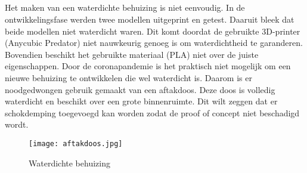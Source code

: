 \subsection{}
Het maken van een waterdichte behuizing is niet eenvoudig. In de ontwikkelingsfase werden twee modellen uitgeprint en getest. Daaruit bleek dat beide modellen niet waterdicht waren. Dit komt doordat de gebruikte 3D-printer (Anycubic Predator) niet nauwkeurig genoeg is om waterdichtheid te garanderen. Bovendien beschikt het gebruikte materiaal (PLA) niet over de juiste eigenschappen. Door de coronapandemie is het praktisch niet mogelijk om een nieuwe behuizing te ontwikkelen die wel waterdicht is. Daarom is er noodgedwongen gebruik gemaakt van een aftakdoos. Deze doos is volledig waterdicht en beschikt over een grote binnenruimte. Dit wilt zeggen dat er schokdemping toegevoegd kan worden zodat de proof of concept niet beschadigd wordt.
\begin{figure}
	\texttt{[image: aftakdoos.jpg]}
	\caption{Waterdichte behuizing}
	\label{fig:case}
\end{figure}
\section{}
\label{ch:backend}

